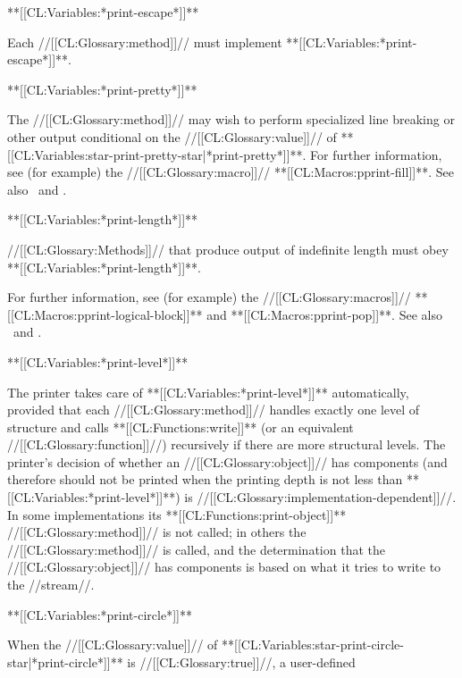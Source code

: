 \item{**[[CL:Variables:*print-escape*]]**}

Each //[[CL:Glossary:method]]// must implement **[[CL:Variables:*print-escape*]]**.

\item{**[[CL:Variables:*print-pretty*]]**}

The //[[CL:Glossary:method]]// may wish to perform specialized line breaking or other output conditional on the //[[CL:Glossary:value]]// of **[[CL:Variables:star-print-pretty-star|*print-pretty*]]**. For further information, see (for example) the //[[CL:Glossary:macro]]// **[[CL:Macros:pprint-fill]]**. See also \secref\PPrintDispatchTables\ and \secref\PrettyPrinterExamples.


\item{**[[CL:Variables:*print-length*]]**}

//[[CL:Glossary:Methods]]// that produce output of indefinite length must obey **[[CL:Variables:*print-length*]]**.

For further information, see (for example) the //[[CL:Glossary:macros]]// **[[CL:Macros:pprint-logical-block]]** and **[[CL:Macros:pprint-pop]]**. See also \secref\PPrintDispatchTables\ and \secref\PrettyPrinterExamples.


\item{**[[CL:Variables:*print-level*]]**}

The printer takes care of **[[CL:Variables:*print-level*]]** automatically, provided that each //[[CL:Glossary:method]]// handles exactly one level of structure and calls **[[CL:Functions:write]]** (or an equivalent //[[CL:Glossary:function]]//) recursively if there are more structural levels. The printer's decision of whether an //[[CL:Glossary:object]]// has components (and therefore should not be printed when the printing depth is not less than **[[CL:Variables:*print-level*]]**) is //[[CL:Glossary:implementation-dependent]]//. In some implementations its **[[CL:Functions:print-object]]** //[[CL:Glossary:method]]// is not called; in others the //[[CL:Glossary:method]]// is called, and the determination that the //[[CL:Glossary:object]]// has components is based on what it tries to write to the //stream//.

\item{**[[CL:Variables:*print-circle*]]**}

When the //[[CL:Glossary:value]]// of **[[CL:Variables:star-print-circle-star|*print-circle*]]** is //[[CL:Glossary:true]]//, a user-defined

